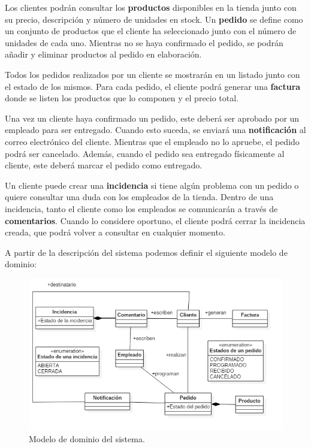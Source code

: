 \documentclass[11pt,spanish,listoffigures]{tfgetsinf}
\begin{document}
Los clientes podrán consultar los \textbf{productos} disponibles en la tienda junto con su precio, descripción y número de unidades en stock. Un \textbf{pedido} se define como un conjunto de productos que el cliente ha seleccionado junto con el número de unidades de cada uno. Mientras no se haya confirmado el pedido, se podrán añadir y eliminar productos al pedido en elaboración.

Todos los pedidos realizados por un cliente se mostrarán en un listado junto con el estado de los mismos. Para cada pedido, el cliente podrá generar una \textbf{factura} donde se listen los productos que lo componen y el precio total.

Una vez un cliente haya confirmado un pedido, este deberá ser aprobado por un empleado para ser entregado. Cuando esto suceda, se enviará una \textbf{notificación} al correo electrónico del cliente. Mientras que el empleado no lo apruebe, el pedido podrá ser cancelado. Además, cuando el pedido sea entregado físicamente al cliente, este deberá marcar el pedido como entregado.

Un cliente puede crear una \textbf{incidencia} si tiene algún problema con un pedido o quiere consultar una duda con los empleados de la tienda. Dentro de una incidencia, tanto el cliente como los empleados se comunicarán a través de \textbf{comentarios}. Cuando lo considere oportuno, el cliente podrá cerrar la incidencia creada, que podrá volver a consultar en cualquier momento.

A partir de la descripción del sistema podemos definir el siguiente modelo de dominio:

\begin{figure}[h]
\centering
\includegraphics[scale=0.5]{modelo_dominio_final}
\caption{Modelo de dominio del sistema.}
\end{figure}
\end{document}

